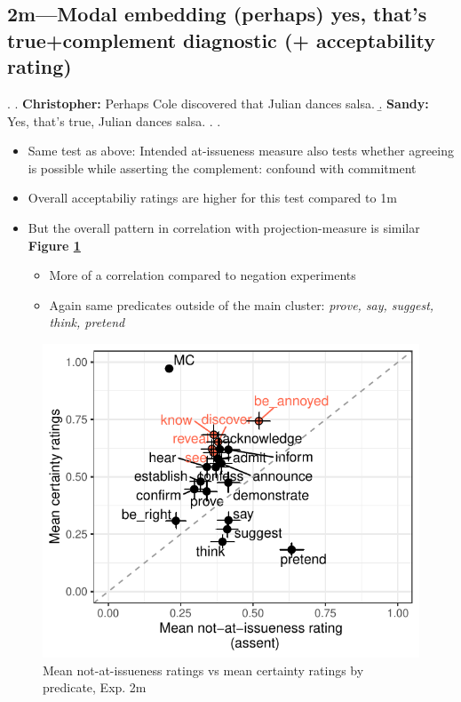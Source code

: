 \documentclass[11pt]{article}
\begin{document}

	\pagebreak
	\subsection{2m---Modal embedding (perhaps) yes, that's true+complement diagnostic (+ acceptability rating)} %
		\ex. \a. \textbf{Christopher:} Perhaps Cole discovered that Julian dances salsa.
			\b. \textbf{Sandy:} Yes, that’s true, Julian dances salsa.
			\z.
		\z.

		\begin{itemize}
			\item Same test as above: Intended at-issueness measure also tests whether agreeing is possible while asserting the complement: confound with commitment

			\item Overall acceptabiliy ratings are higher for this test compared to 1m
			
			\item But the overall pattern in correlation with projection-measure is similar \textbf{Figure \ref{fig:m2-corr}}
			\begin{itemize}
				\item More of a correlation compared to negation experiments
				\item Again same predicates outside of the main cluster: \emph{prove, say, suggest, think, pretend}
			\end{itemize}
		\end{itemize}

		\begin{figure}[h]
			\centering
			\includegraphics[scale=0.85]{figures/m2-correl.pdf}
			\caption{Mean not-at-issueness ratings vs mean certainty ratings by predicate, Exp. 2m}
			\label{fig:m2-corr}
		\end{figure}
	
\end{document}
